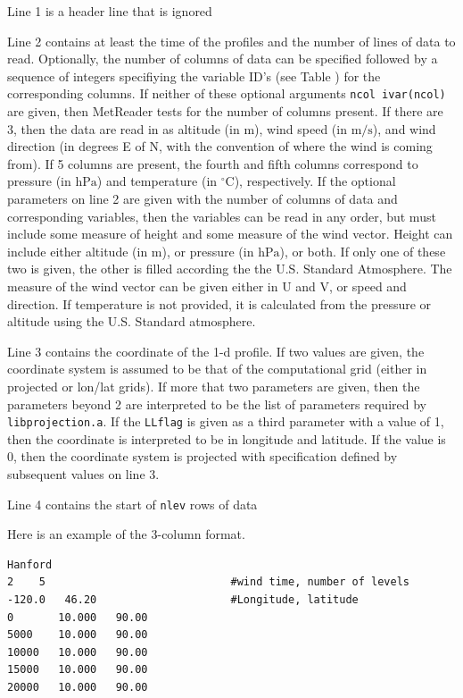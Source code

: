 \documentclass[11pt]{article}   %
\begin{document}
Line 1 is a header line that is ignored

Line 2 contains at least the time of the profiles and the number of lines of data
to read.  Optionally, the number of columns of data can be specified followed by 
a sequence of integers specifiying the variable ID's (see Table ) for the corresponding
columns.  If neither of these optional arguments \texttt{ncol ivar(ncol)} are given,
then MetReader tests for the number of columns present.  If there are 3, then
the data are read in as altitude (in $\mathrm{m}$), wind speed (in $\mathrm{m/s}$), and 
wind direction (in degrees E of N, with the convention of where the wind is coming from).
If 5 columns are present, the fourth and fifth columns correspond to pressure (in $\mathrm{hPa}$)
and temperature (in $\mathrm{^{\circ}C}$), respectively.  If the optional parameters on line 2
are given with the number of columns of data and corresponding variables, then the variables
can be read in any order, but must include some measure of height and some measure of the 
wind vector.  Height can include either altitude (in $\mathrm{m}$), or pressure (in $\mathrm{hPa}$),
or both.  If only one of these two is given, the other is filled according the the U.S. Standard
Atmosphere.  The measure of the wind vector can be given either in U and V, or speed and direction.
If temperature is not provided, it is calculated from the pressure or altitude using the
U.S. Standard atmosphere.

Line 3 contains the coordinate of the 1-d profile.  If two values are given, the coordinate
system is assumed to be that of the computational grid (either in projected or lon/lat grids).
If more that two parameters are given, then the parameters beyond 2 are interpreted to be the list
of parameters required by \texttt{libprojection.a}.
If the \texttt{LLflag} is given as a third parameter with a value of 1, then the coordinate
is interpreted to be in longitude and latitude.  If the value is 0, then the coordinate system
is projected with specification defined by subsequent values on line 3.

Line 4 contains the start of \texttt{nlev} rows of data

Here is an example of the 3-column format.
\begin{verbatim}
Hanford
2    5                             #wind time, number of levels
-120.0   46.20                     #Longitude, latitude
0       10.000   90.00
5000    10.000   90.00
10000   10.000   90.00
15000   10.000   90.00
20000   10.000   90.00
\end{verbatim}
\end{document}
